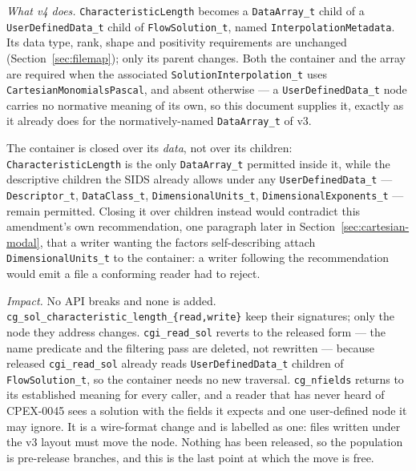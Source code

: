 \documentclass[11pt,letterpaper]{article}
\newif\ifvfourdraft
\newenvironment{v4block}{\ifvfourdraft\color{v4violet}\fi\ignorespaces}{\par}
\begin{document}
{\begin{v4block}
\begin{enumerate}[leftmargin=1.4em,itemsep=0.5em]
    \textit{What v4 does.}  \texttt{CharacteristicLength} becomes a
    \texttt{DataArray\_t} child of a \texttt{UserDefinedData\_t} child of
    \texttt{FlowSolution\_t}, named \texttt{InterpolationMetadata}.  Its data
    type, rank, shape and positivity requirements are unchanged
    (Section~\ref{sec:filemap}); only its parent changes.  Both the container
    and the array are required when the associated
    \texttt{SolutionInterpolation\_t} uses \texttt{CartesianMonomialsPascal},
    and absent otherwise --- a \texttt{UserDefinedData\_t} node carries no
    normative meaning of its own, so this document supplies it, exactly as it
    already does for the normatively-named \texttt{DataArray\_t} of v3.

    The container is closed over its \emph{data}, not over its children:
    \texttt{CharacteristicLength} is the only \texttt{DataArray\_t} permitted
    inside it, while the descriptive children the SIDS already allows under any
    \texttt{UserDefinedData\_t} --- \texttt{Descriptor\_t}, \texttt{DataClass\_t},
    \texttt{DimensionalUnits\_t}, \texttt{DimensionalExponents\_t} --- remain
    permitted.  Closing it over children instead would contradict this
    amendment's own recommendation, one paragraph later in
    Section~\ref{sec:cartesian-modal}, that a writer wanting the factors
    self-describing attach \texttt{DimensionalUnits\_t} to the container: a
    writer following the recommendation would emit a file a conforming reader
    had to reject.

    \textit{Impact.}  No API breaks and none is added.
    \texttt{cg\_sol\_characteristic\_length\_\{read,write\}} keep their
    signatures; only the node they address changes.  \texttt{cgi\_read\_sol}
    reverts to the released form --- the name predicate and the filtering pass
    are deleted, not rewritten --- because released \texttt{cgi\_read\_sol}
    already reads \texttt{UserDefinedData\_t} children of
    \texttt{FlowSolution\_t}, so the container needs no new traversal.
    \texttt{cg\_nfields} returns to its established meaning for every caller,
    and a reader that has never heard of CPEX-0045 sees a solution with the
    fields it expects and one user-defined node it may ignore.  It is a
    wire-format change and is labelled as one: files written under the v3 layout
    must move the node.  Nothing has been released, so the population is
    pre-release branches, and this is the last point at which the move is free.


\end{enumerate}
\end{v4block}}
\end{document}
